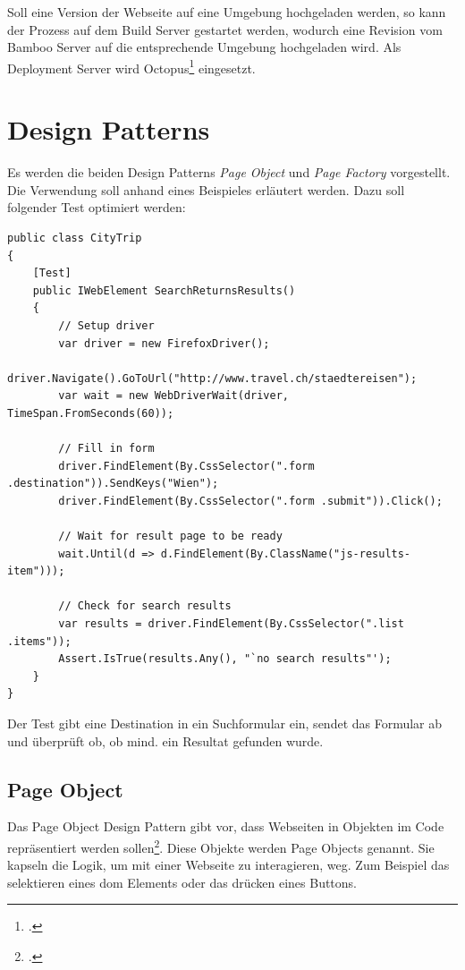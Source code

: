 Soll eine Version der Webseite auf eine Umgebung hochgeladen werden, so kann der Prozess auf dem Build Server gestartet werden, wodurch eine Revision vom Bamboo Server auf die entsprechende Umgebung hochgeladen wird. Als Deployment Server wird Octopus\footcite{Octopus_Deploy_2015-09-28} eingesetzt.

\section{Design Patterns}
\label{sec:umsetzung:patterns}
Es werden die beiden Design Patterns \textit{Page Object} und \textit{Page Factory} vorgestellt. Die Verwendung soll anhand eines Beispieles erläutert werden. Dazu soll folgender Test optimiert werden:

\begin{lstlisting}        
public class CityTrip
{	    	
	[Test]
	public IWebElement SearchReturnsResults() 
	{
		// Setup driver
		var driver = new FirefoxDriver();
		driver.Navigate().GoToUrl("http://www.travel.ch/staedtereisen");
		var wait = new WebDriverWait(driver, TimeSpan.FromSeconds(60));
		
		// Fill in form
		driver.FindElement(By.CssSelector(".form .destination")).SendKeys("Wien");
		driver.FindElement(By.CssSelector(".form .submit")).Click();
		
		// Wait for result page to be ready
		wait.Until(d => d.FindElement(By.ClassName("js-results-item")));
		
		// Check for search results
		var results = driver.FindElement(By.CssSelector(".list .items"));
		Assert.IsTrue(results.Any(), "`no search results"');
	}
}
\end{lstlisting}

Der Test gibt eine Destination in ein Suchformular ein, sendet das Formular ab und überprüft ob, ob mind. ein Resultat gefunden wurde.

\subsection{Page Object}
\label{sec:umsetzung:patterns:pageobject}
Das Page Object Design Pattern gibt vor, dass Webseiten in Objekten im Code repräsentiert werden sollen\footcite{PageObjects}. Diese Objekte werden Page Objects genannt. Sie kapseln die Logik, um mit einer Webseite zu interagieren, weg. Zum Beispiel das selektieren eines \gls{dom} Elements oder das drücken eines Buttons.


